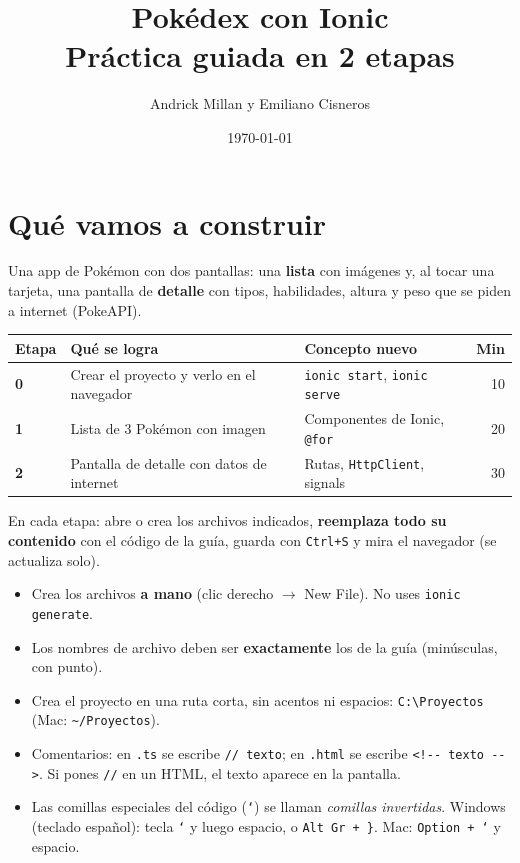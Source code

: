 \documentclass[11pt,a4paper]{article}
\title{{\Huge\bfseries\color{rojo} Pok\'edex con Ionic}\\[0.5em]{\Large Pr\'actica guiada en 2 etapas}}
\author{Andrick Millan y Emiliano Cisneros}
\date{\today}
\newcommand{\cmd}[1]{\texttt{#1}}
\begin{document}
\sloppy
\maketitle\thispagestyle{fancy}

\section{Qu\'e vamos a construir}
Una app de Pok\'emon con dos pantallas: una \textbf{lista} con im\'agenes y, al tocar una tarjeta,
una pantalla de \textbf{detalle} con tipos, habilidades, altura y peso que se piden a internet (PokeAPI).

\begin{center}
\begin{tabularx}{\linewidth}{@{}>{\bfseries}p{1.6cm} >{\raggedright\arraybackslash}X >{\raggedright\arraybackslash}p{4.4cm} r@{}}
\toprule
Etapa & Qu\'e se logra & Concepto nuevo & Min \\
\midrule
0 & Crear el proyecto y verlo en el navegador & \cmd{ionic start}, \cmd{ionic serve} & 10 \\
1 & Lista de 3 Pok\'emon con imagen & Componentes de Ionic, \cmd{@for} & 20 \\
2 & Pantalla de detalle con datos de internet & Rutas, \cmd{HttpClient}, signals & 30 \\
\bottomrule
\end{tabularx}
\end{center}

\begin{nota}
En cada etapa: abre o crea los archivos indicados, \textbf{reemplaza todo su contenido} con el c\'odigo de la gu\'ia,
guarda con \texttt{Ctrl+S} y mira el navegador (se actualiza solo).
\end{nota}

\begin{alerta}
\begin{itemize}
\item Crea los archivos \textbf{a mano} (clic derecho $\rightarrow$ New File). No uses \cmd{ionic generate}.
\item Los nombres de archivo deben ser \textbf{exactamente} los de la gu\'ia (min\'usculas, con punto).
\item Crea el proyecto en una ruta corta, sin acentos ni espacios: \texttt{C:\textbackslash Proyectos} (Mac: \texttt{\~{}/Proyectos}).
\item Comentarios: en \texttt{.ts} se escribe \texttt{// texto}; en \texttt{.html} se escribe \texttt{<!-{}- texto -{}->}. Si pones \texttt{//} en un HTML, el texto aparece en la pantalla.
\item Las comillas especiales del c\'odigo (\texttt{`}) se llaman \emph{comillas invertidas}. Windows (teclado espa\~nol): tecla \texttt{`} y luego espacio, o \texttt{Alt Gr + \}}. Mac: \texttt{Option + `} y espacio.
\end{itemize}
\end{alerta}
\end{document}
